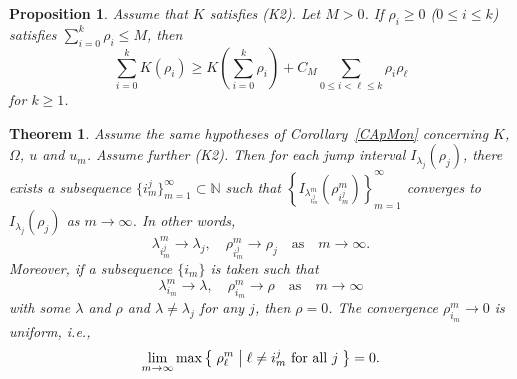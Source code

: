 \documentclass[10pt,a4paper]{amsart}
\newtheorem{thm}{Theorem}
\newtheorem{prop}{Proposition}
\begin{document}
\begin{prop} \label{PInd}
Assume that $K$ satisfies (K2).
 Let $M>0$.
 If $\rho_i\ge0$ ($0\le i \le k$) satisfies $\sum_{i=0}^k\rho_i\le M$, then
\begin{equation} \label{EInd}
    \sum_{i=0}^k K(\rho_i)
    \ge K \left(\sum_{i=0}^k \rho_i \right)
    + C_M \sum_{0\le i<\ell\le k} \rho_i \rho_\ell
\end{equation}
for $k\ge1$.
\end{prop}

\begin{thm} \label{TCJ}
Assume the same hypotheses of Corollary~\ref{CApMon} concerning $K$, $\Omega$, $u$ and $u_m$.
 Assume further (K2).
 Then for each jump interval $I_{\lambda_j}(\rho_j)$, there exists a subsequence $\{i_m^j\}_{m=1}^\infty\subset\mathbb{N}$ such that $\left\{I_{\lambda_{i_m^j}^m}(\rho_{i_m^j}^m)\right\}_{m=1}^\infty$ converges to $I_{\lambda_j}(\rho_j)$ as $m\to\infty$.
 In other words,
\[
    \lambda_{i_m^j}^m \to \lambda_j, \quad
    \rho_{i_m^j}^m \to \rho_j
    \quad\text{as}\quad m \to \infty.
\]
Moreover, if a subsequence $\{i_m\}$ is taken such that
\[
    \lambda_{i_m}^m \to \lambda, \quad
    \rho_{i_m}^m \to \rho
    \quad\text{as}\quad m \to \infty
\]
with some $\lambda$ and $\rho$ and $\lambda\neq\lambda_j$ for any $j$, then $\rho=0$.
 The convergence $\rho_{i_m}^m\to0$ is uniform, i.e., 
\[
    \lim_{m\to\infty} \max \left\{\; \rho_\ell^m \bigm|
    \ell\neq i_m^j\ \text{for all}\ j\; \right\} = 0.
\] 
\end{thm}
\end{document}
